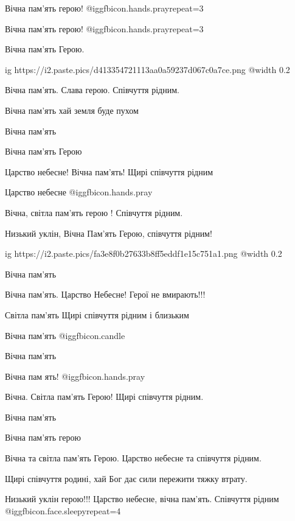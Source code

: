 \begin{itemize}
Вічна пам'ять герою! @igg{fbicon.hands.pray}{repeat=3} 

Вічна пам'ять герою! @igg{fbicon.hands.pray}{repeat=3} 

Вічна пам'ять Герою.

\ifcmt
  ig https://i2.paste.pics/d413354721113aa0a59237d067c0a7ce.png
  @width 0.2
\fi


Вічна пам'ять. Слава герою. Співчуття рідним.

Вічна пам'ять хай земля буде пухом

Вічна пам'ять

Вічна пам'ять Герою

Царство небесне! Вічна пам'ять! Щирі співчуття рідним

Царство небесне  @igg{fbicon.hands.pray} 

Вічна, світла пам'ять герою ! Співчуття рідним.

Низький уклін, Вічна Пам'ять Герою, співчуття рідним!

\ifcmt
  ig https://i2.paste.pics/fa3e8f0b27633b8ff5eddf1e15c751a1.png
  @width 0.2
\fi

Вічна пам'ять

Вічна пам'ять. Царство Небесне! Герої не вмирають!!!

Світла пам'ять
Щирі співчуття рідним і близьким

Вічна пам'ять  @igg{fbicon.candle} ️

Вічна пам'ять

Вічна пам ять! @igg{fbicon.hands.pray} 

Вічна. Світла пам'ять Герою! Щирі співчуття рідним.

Вічна пам'ять

Вічна пам'ять герою

Вічна та світла пам'ять Герою. Царство небесне та співчуття рідним.

Щирі співчуття родині, хай Бог дає сили пережити тяжку втрату.

Низький уклін герою!!! Царство небесне, вічна пам’ять. Співчуття рідним @igg{fbicon.face.sleepy}{repeat=4} 


\end{itemize}
